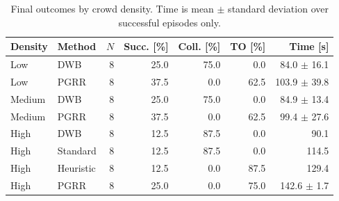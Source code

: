 \begin{table}[t]
\caption{Final outcomes by crowd density. Time is mean $\pm$ standard deviation over
successful episodes only.}
\label{tab:density-results}
\centering
\footnotesize
\begin{tabular}{llrrrrr}
\toprule
Density & Method & $N$ & Succ. [\%] & Coll. [\%] & TO [\%] & Time [s] \\
\midrule
Low & DWB & 8 & 25.0 & 75.0 & 0.0 & 84.0 $\pm$ 16.1 \\
Low & PGRR & 8 & 37.5 & 0.0 & 62.5 & 103.9 $\pm$ 39.8 \\
Medium & DWB & 8 & 25.0 & 75.0 & 0.0 & 84.9 $\pm$ 13.4 \\
Medium & PGRR & 8 & 37.5 & 0.0 & 62.5 & 99.4 $\pm$ 27.6 \\
High & DWB & 8 & 12.5 & 87.5 & 0.0 & 90.1 \\
High & Standard & 8 & 12.5 & 87.5 & 0.0 & 114.5 \\
High & Heuristic & 8 & 12.5 & 0.0 & 87.5 & 129.4 \\
High & PGRR & 8 & 25.0 & 0.0 & 75.0 & 142.6 $\pm$ 1.7 \\
\bottomrule
\end{tabular}
\end{table}
